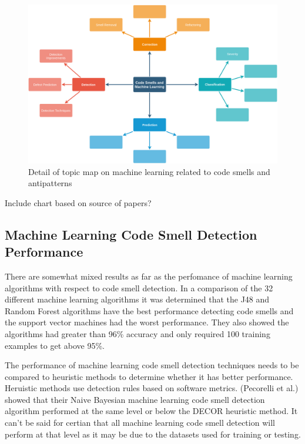 \documentclass[conference]{IEEEtran}
\begin{document}
\begin{figure}[!ht]
  \centerline{\includegraphics[width=\textwidth]{ML-codesmells.png}}
  \caption{Detail of topic map on machine learning related to code smells and antipatterns}
  \label{fig:ML}
\end{figure} 

Include chart based on source of papers?

\subsection{Machine Learning Code Smell Detection Performance}
There are somewhat mixed results as far as the perfomance of machine learning algorithms with respect to code smell detection\cite{nucci_detecting_2018}.
In a comparison of the 32 different machine learning algorithms\cite{arcelli_fontana_comparing_2016} it was determined that the J48 and Random Forest algorithms have the best performance detecting code smells and the support vector machines had the worst performance. They also showed the algorithms had greater than 96\% accuracy and only required 100 training examples to get above 95\%.

The performance of machine learning code smell detection techniques needs to be compared to heuristic methods to determine whether it has better performance. Heruistic methods use detection rules based on software metrics. (Pecorelli et al.) showed\cite{pecorelli_comparing_2019} that their Naive Bayesian machine learning code smell detection algorithm performed at the same level or below the DECOR heuristic method. 
It can't be said for certian that all machine learning code smell detection will perform at that level as it may be due to the datasets used for training or testing.
\end{document}
